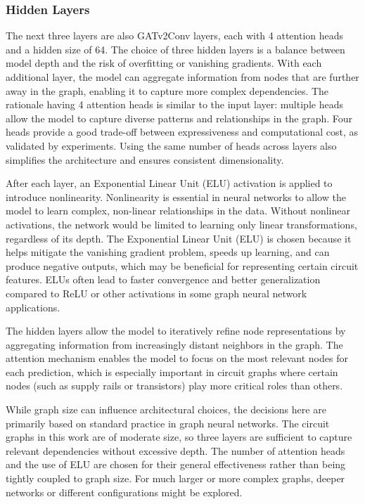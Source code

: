 \documentclass[10pt,twocolumn,letterpaper]{article}
\begin{document}
\subsubsection{Hidden Layers}
\label{subsubsec:hidden_layers}

The next three layers are also GATv2Conv layers, each with 4 attention heads and a hidden size of 64. The choice of three hidden layers is a balance between model depth and the risk of overfitting or vanishing gradients. With each additional layer, the model can aggregate information from nodes that are further away in the graph, enabling it to capture more complex dependencies.  The rationale having 4 attention heads is similar to the input layer: multiple heads allow the model to capture diverse patterns and relationships in the graph. Four heads provide a good trade-off between expressiveness and computational cost, as validated by experiments. Using the same number of heads across layers also simplifies the architecture and ensures consistent dimensionality.

After each layer, an Exponential Linear Unit (ELU) activation is applied to introduce nonlinearity. Nonlinearity is essential in neural networks to allow the model to learn complex, non-linear relationships in the data. Without nonlinear activations, the network would be limited to learning only linear transformations, regardless of its depth. The Exponential Linear Unit (ELU) is chosen because it helps mitigate the vanishing gradient problem, speeds up learning, and can produce negative outputs, which may be beneficial for representing certain circuit features. ELUs often lead to faster convergence and better generalization compared to ReLU or other activations in some graph neural network applications.

The hidden layers allow the model to iteratively refine node representations by aggregating information from increasingly distant neighbors in the graph. The attention mechanism enables the model to focus on the most relevant nodes for each prediction, which is especially important in circuit graphs where certain nodes (such as supply rails or transistors) play more critical roles than others.

While graph size can influence architectural choices, the decisions here are primarily based on standard practice in graph neural networks. The circuit graphs in this work are of moderate size, so three layers are sufficient to capture relevant dependencies without excessive depth. The number of attention heads and the use of ELU are chosen for their general effectiveness rather than being tightly coupled to graph size. For much larger or more complex graphs, deeper networks or different configurations might be explored.
\end{document}
